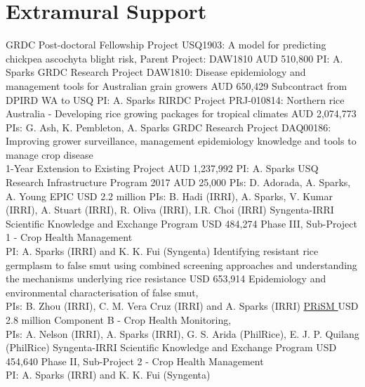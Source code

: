\section*{Extramural Support}
  \begin{entrylist}
			{GRDC Post-doctoral Fellowship Project USQ1903: A model for predicting chickpea ascochyta blight risk, Parent Project: DAW1810}
			{AUD 510,800}
			{PI: A. Sparks}
			{GRDC Research Project DAW1810: Disease epidemiology and management tools for Australian grain growers}
			{AUD 650,429}
			{Subcontract from DPIRD WA to USQ PI: A. Sparks}
			{RIRDC Project PRJ-010814: Northern rice Australia - Developing rice growing packages for tropical climates}
			{AUD 2,074,773}
			{PIs: G. Ash, K. Pembleton, A. Sparks}
			{GRDC Research Project DAQ00186: Improving grower surveillance, management epidemiology knowledge and tools to manage crop disease\\1-Year Extension to Existing Project}
			{AUD 1,237,992}
			{PI: A. Sparks}
      {USQ Research Infrastructure Program 2017}
      {AUD 25,000}
      {PIs: D. Adorada, A. Sparks, A. Young}
      {EPIC }
      {USD 2.2 million}
      {PIs: B. Hadi (IRRI), A. Sparks, V. Kumar (IRRI), A. Stuart (IRRI), R. Oliva (IRRI), I.R. Choi (IRRI)}
	    {Syngenta-IRRI Scientific Knowledge and Exchange Program}
	    {USD 484,274}
	    {Phase III, Sub-Project 1 - Crop Health Management\\PI: A. Sparks (IRRI) and K. K. Fui (Syngenta)}
      {Identifying resistant rice germplasm to false smut using combined screening approaches and understanding the mechanisms underlying rice resistance}
      {USD 653,914}
      {Epidemiology and environmental characterisation of false smut,\\PIs: B. Zhou (IRRI), C. M. {Vera Cruz} (IRRI) and A. Sparks (IRRI)}
	    {\href{http://philippinericeinfo.ph/}{PRiSM }}
	    {USD 2.8 million}
	    {Component B - Crop Health Monitoring,\\PIs: A. Nelson (IRRI), A. Sparks (IRRI), G. S. Arida (PhilRice), E. J. P. Quilang (PhilRice)}
	    {Syngenta-IRRI Scientific Knowledge and Exchange Program}
	    {USD 454,640}
	    {Phase II, Sub-Project 2 - Crop Health Management\\PI: A. Sparks (IRRI) and K. K. Fui (Syngenta)}
\end{entrylist}


